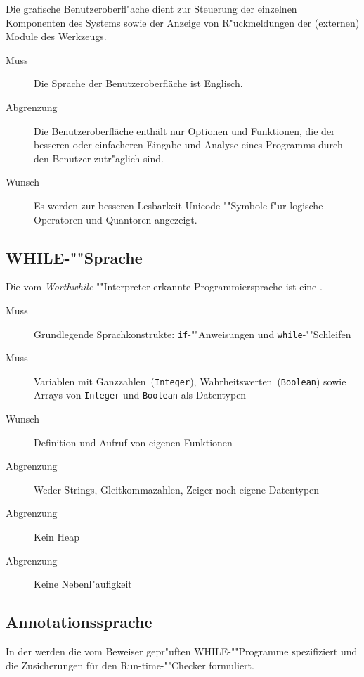 Die grafische Benutzeroberfl"ache dient zur Steuerung der einzelnen Komponenten des Systems sowie der Anzeige von R"uckmeldungen der (externen) Module des Werkzeugs.%

\begin{description}%
    \item [Muss] Die Sprache der Benutzeroberfläche ist Englisch.%
    \item [Abgrenzung] Die Benutzeroberfläche enthält nur Optionen und Funktionen, die der besseren oder einfacheren Eingabe und Analyse eines Programms durch den Benutzer zutr"aglich sind.%
    \item [Wunsch] Es werden zur besseren Lesbarkeit Unicode-""Symbole f"ur logische Operatoren und Quantoren angezeigt.%
\end{description}%

\subsection{WHILE-""Sprache}%

Die vom \textit{Worthwhile}-""Interpreter erkannte Programmiersprache ist eine .

\begin{description}%
    \item [Muss] Grundlegende Sprachkonstrukte: \texttt{if}-""Anweisungen und \texttt{while}-""Schleifen
    \item [Muss] Variablen mit Ganzzahlen~(\texttt{Integer}), Wahrheitswerten~(\texttt{Boolean}) sowie Arrays von \texttt{Integer} und \texttt{Boolean} als Datentypen%
    \item [Wunsch] Definition und Aufruf von eigenen Funktionen%
    \item [Abgrenzung] Weder Strings, Gleitkommazahlen, Zeiger noch eigene Datentypen%
    \item [Abgrenzung] Kein Heap%
    \item [Abgrenzung] Keine Nebenl"aufigkeit%
\end{description}%

\subsection{Annotationssprache}%

In der  werden die vom Beweiser gepr"uften WHILE-""Programme spezifiziert und die Zusicherungen für den Run-time-""Checker formuliert.%

